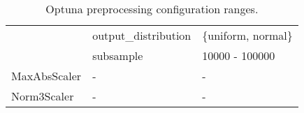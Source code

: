 \begin{table*}
\begin{tabular}{@{}l>{\ttfamily}lp{}@{}}
                                     & output\_distribution              & \{uniform, normal\}                      \\ \cmidrule{2-3}
                                     & subsample                         & 10000 - 100000                           \\ \midrule
MaxAbsScaler                         & -                                 & -                                        \\ \midrule
Norm3Scaler                          & -                                 & -                                        \\ \midrule
\end{tabular}
\caption{Optuna preprocessing configuration ranges.}
\label{tab:optuna_preprocessing_configurations}
\end{table*}


